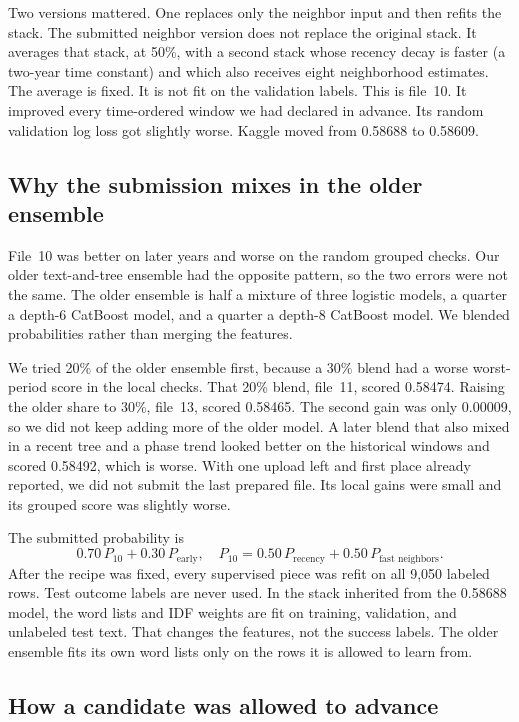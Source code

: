 Two versions mattered. One replaces only the neighbor input and then refits
the stack. The submitted neighbor version does not replace the original
stack. It averages that stack, at 50\%, with a second stack whose recency
decay is faster (a two-year time constant) and which also receives eight
neighborhood estimates. The average is fixed. It is not fit on the validation
labels. This is file~10. It improved every time-ordered window we had
declared in advance. Its random validation log loss got slightly worse.
Kaggle moved from 0.58688 to 0.58609.

\subsection{Why the submission mixes in the older ensemble}

File~10 was better on later years and worse on the random grouped checks.
Our older text-and-tree ensemble had the opposite pattern, so the two errors
were not the same. The older ensemble is half a mixture of three logistic
models, a quarter a depth-6 CatBoost model, and a quarter a depth-8 CatBoost
model. We blended probabilities rather than merging the features.

We tried 20\% of the older ensemble first, because a 30\% blend had a worse
worst-period score in the local checks. That 20\% blend, file~11, scored
0.58474. Raising the older share to 30\%, file~13, scored 0.58465. The second
gain was only 0.00009, so we did not keep adding more of the older model.
A later blend that also mixed in a recent tree and a phase trend looked
better on the historical windows and scored 0.58492, which is worse. With
one upload left and first place already reported, we did not submit the last
prepared file. Its local gains were small and its grouped score was slightly
worse.

The submitted probability is
\[
0.70\,P_{10} + 0.30\,P_{\text{early}},
\quad
P_{10} = 0.50\,P_{\text{recency}} + 0.50\,P_{\text{fast neighbors}}.
\]
After the recipe was fixed, every supervised piece was refit on all 9,050
labeled rows. Test outcome labels are never used. In the stack inherited from
the 0.58688 model, the word lists and IDF weights are fit on training,
validation, and unlabeled test text. That changes the features, not the
success labels. The older ensemble fits its own word lists only on the rows
it is allowed to learn from.

\subsection{How a candidate was allowed to advance}

